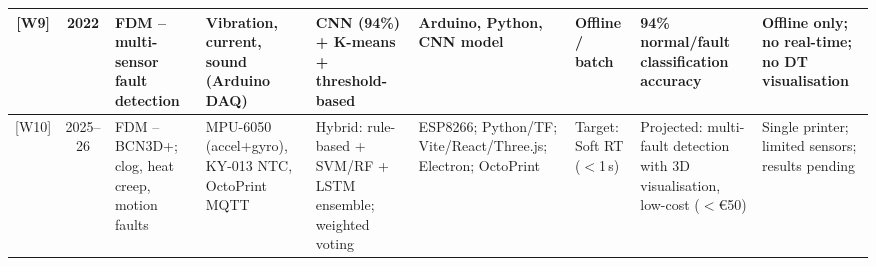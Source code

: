 {\begin{xltabular}{\linewidth}{| c | c | J | J | J | J | K | J | J |}
	\hline
	{[W9]} & 2022 & FDM -- multi-sensor fault detection & Vibration, current, sound (Arduino DAQ) & CNN (94\%) + K-means + threshold-based & Arduino, Python, CNN model & Offline / batch & 94\% normal/fault classification accuracy & Offline only; no real-time; no DT visualisation \\
	\hline
	{[W10]} & 2025--26 & FDM -- BCN3D+; clog, heat creep, motion faults & MPU-6050 (accel+gyro), KY-013 NTC, OctoPrint MQTT & Hybrid: rule-based + SVM/RF + LSTM ensemble; weighted voting & ESP8266; Python/TF; Vite/React/Three.js; Electron; OctoPrint & Target: Soft RT ($<$1\,s) & Projected: multi-fault detection with 3D visualisation, low-cost ($<$\euro{}50) & Single printer; limited sensors; results pending \\
	\hline
\end{xltabular}
}